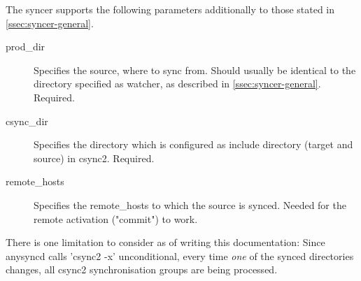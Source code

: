 The syncer supports the following parameters additionally to those
stated in \ref{ssec:syncer-general}.

\begin{description}
    \item[prod_dir] Specifies the source, where to sync from. Should usually be
        identical to the directory specified as watcher, as described in
        \ref{ssec:syncer-general}. Required.

    \item[csync_dir] Specifies the directory which is configured as include
        directory (target and source) in csync2. Required.

    \item[remote_hosts] Specifies the remote_hosts to which the source is
        synced. Needed for the remote activation ("commit") to work.
\end{description}


There is one limitation to consider as of writing this documentation: Since
anysyncd calls 'csync2 -x' unconditional, every time \textit{one} of the synced
directories changes, all csync2 synchronisation groups
are being processed.

